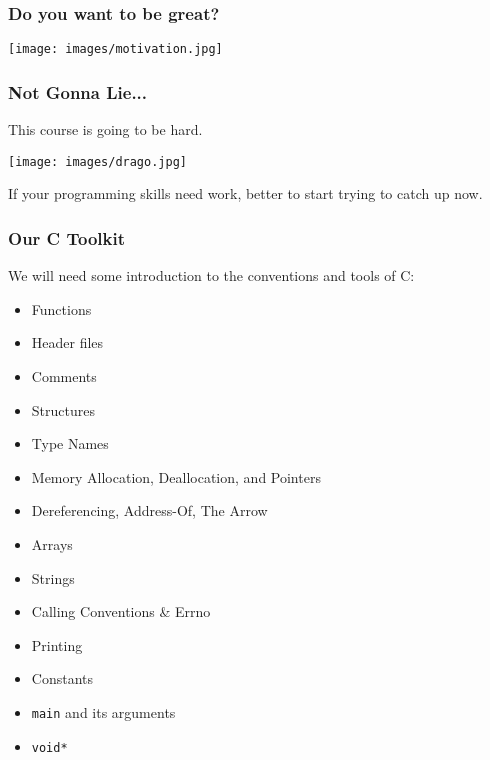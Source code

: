 \begin{frame}
\frametitle{Do you want to be great?}

\begin{center}
	\texttt{[image: images/motivation.jpg]}
\end{center}


\end{frame}



\begin{frame}
	\frametitle{Not Gonna Lie...}

	This course is going to be hard.

	\begin{center}
		\texttt{[image: images/drago.jpg]}
	\end{center}

	If your programming skills need work, better to start trying to catch up now.

\end{frame}


\begin{frame}
	\frametitle{Our C Toolkit}

	We will need some introduction to the conventions and tools of C:
	\begin{itemize}
		\item Functions
		\item Header files
		\item Comments
		\item Structures
		\item Type Names
		\item Memory Allocation, Deallocation, and Pointers
		\item Dereferencing, Address-Of, The Arrow
		\item Arrays
		\item Strings
		\item Calling Conventions \& Errno
		\item Printing
		\item Constants
		\item \texttt{main} and its arguments
		\item \texttt{void*}
	\end{itemize}


\end{frame}






